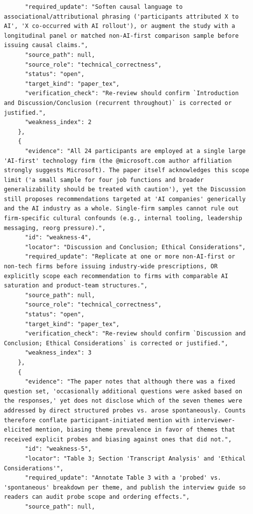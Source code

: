 \documentclass[11pt]{article}
\begin{document}
\begin{verbatim}
      "required_update": "Soften causal language to associational/attributional phrasing ('participants attributed X to AI', 'X co-occurred with AI rollout'), or augment the study with a longitudinal panel or matched non-AI-first comparison sample before issuing causal claims.",
      "source_path": null,
      "source_role": "technical_correctness",
      "status": "open",
      "target_kind": "paper_tex",
      "verification_check": "Re-review should confirm `Introduction and Discussion/Conclusion (recurrent throughout)` is corrected or justified.",
      "weakness_index": 2
    },
    {
      "evidence": "All 24 participants are employed at a single large 'AI-first' technology firm (the @microsoft.com author affiliation strongly suggests Microsoft). The paper itself acknowledges this scope limit ('a small sample for four job functions and broader generalizability should be treated with caution'), yet the Discussion still proposes recommendations targeted at 'AI companies' generically and the AI industry as a whole. Single-firm samples cannot rule out firm-specific cultural confounds (e.g., internal tooling, leadership messaging, reorg pressure).",
      "id": "weakness-4",
      "locator": "Discussion and Conclusion; Ethical Considerations",
      "required_update": "Replicate at one or more non-AI-first or non-tech firms before issuing industry-wide prescriptions, OR explicitly scope each recommendation to firms with comparable AI saturation and product-team structures.",
      "source_path": null,
      "source_role": "technical_correctness",
      "status": "open",
      "target_kind": "paper_tex",
      "verification_check": "Re-review should confirm `Discussion and Conclusion; Ethical Considerations` is corrected or justified.",
      "weakness_index": 3
    },
    {
      "evidence": "The paper notes that although there was a fixed question set, 'occasionally additional questions were asked based on the responses,' yet does not disclose which of the seven themes were addressed by direct structured probes vs. arose spontaneously. Counts therefore conflate participant-initiated mention with interviewer-elicited mention, biasing theme prevalence in favor of themes that received explicit probes and biasing against ones that did not.",
      "id": "weakness-5",
      "locator": "Table 3; Section 'Transcript Analysis' and 'Ethical Considerations'",
      "required_update": "Annotate Table 3 with a 'probed' vs. 'spontaneous' breakdown per theme, and publish the interview guide so readers can audit probe scope and ordering effects.",
      "source_path": null,

\end{verbatim}
\end{document}
